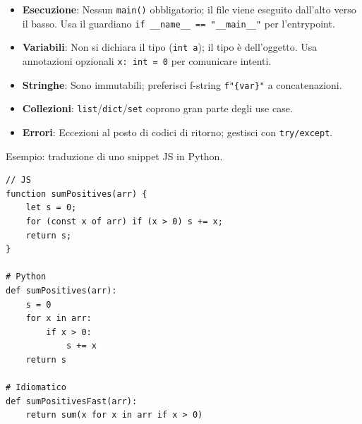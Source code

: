 \begin{tcolorbox}[title=Per chi viene da C/Java/JS]
	\begin{itemize}
		\item \textbf{Esecuzione}: Nessun \texttt{main()} obbligatorio; il file viene eseguito dall'alto verso il basso. Usa il guardiano \verb|if __name__ == "__main__"| per l'entrypoint.
		\item \textbf{Variabili}: Non si dichiara il tipo (\texttt{int a}); il tipo è dell'oggetto. Usa annotazioni opzionali \verb|x: int = 0| per comunicare intenti.
		\item \textbf{Stringhe}: Sono immutabili; preferisci f-string \verb|f"{var}"| a concatenazioni.  
		\item \textbf{Collezioni}: \texttt{list}/\texttt{dict}/\texttt{set} coprono gran parte degli use case.  
		\item \textbf{Errori}: Eccezioni al posto di codici di ritorno; gestisci con \verb|try/except|.
	\end{itemize}
	
	
	Esempio: traduzione di uno snippet JS in Python.
\begin{lstlisting}
// JS
function sumPositives(arr) {
    let s = 0;
    for (const x of arr) if (x > 0) s += x;
    return s;
}

# Python
def sumPositives(arr):
    s = 0
    for x in arr:
        if x > 0:
            s += x
    return s

# Idiomatico
def sumPositivesFast(arr):
    return sum(x for x in arr if x > 0)
\end{lstlisting}
\end{tcolorbox}


